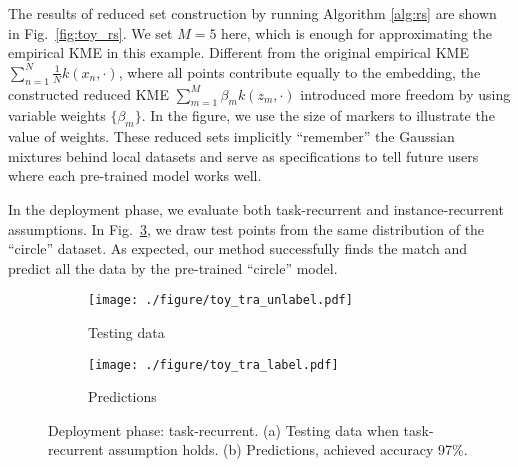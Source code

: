 \documentclass[paper=letter, fontsize=20pt]{article}
\begin{document}
The results of reduced set construction by running Algorithm \ref{alg:rs} are shown in Fig.~\ref{fig:toy_rs}. We set $M=5$ here, which is enough for approximating the empirical KME in this example. Different from the original empirical KME $\sum_{n=1}^N \frac{1}{N}k(x_n,\cdot)$, where all points contribute equally to the embedding, the constructed reduced KME $\sum_{m=1}^M \beta_m k(z_m,\cdot)$ introduced more freedom by using variable weights $\{ \beta_m\}$. In the figure, we use the size of markers to illustrate the value of weights. These reduced sets implicitly ``remember'' the Gaussian mixtures behind local datasets and serve as specifications to tell future users where each pre-trained model works well.

In the deployment phase, we evaluate both task-recurrent and instance-recurrent assumptions. In Fig.~\ref{fig:deployment_tra}, we draw test points from the same distribution of the ``circle'' dataset. As expected, our method successfully finds the match and predict all the data by the pre-trained ``circle'' model. 
\begin{figure}[!htb]
\centering
\begin{subfigure}[b]{0.23\textwidth}
\captionsetup{skip=1pt}
\texttt{[image: ./figure/toy\_tra\_unlabel.pdf]}
\caption{Testing data}\label{fig:toy_ira_unlabel}
\end{subfigure}
\begin{subfigure}[b]{0.23\textwidth}
\captionsetup{skip=1pt}
\texttt{[image: ./figure/toy\_tra\_label.pdf]}
\caption{Predictions}\label{fig:toy_tra_label}
\end{subfigure}
 \caption{Deployment phase: task-recurrent. (a) Testing data when task-recurrent assumption holds. (b) Predictions, achieved accuracy 97\%.}\label{fig:deployment_tra}
\end{figure}
\end{document}
